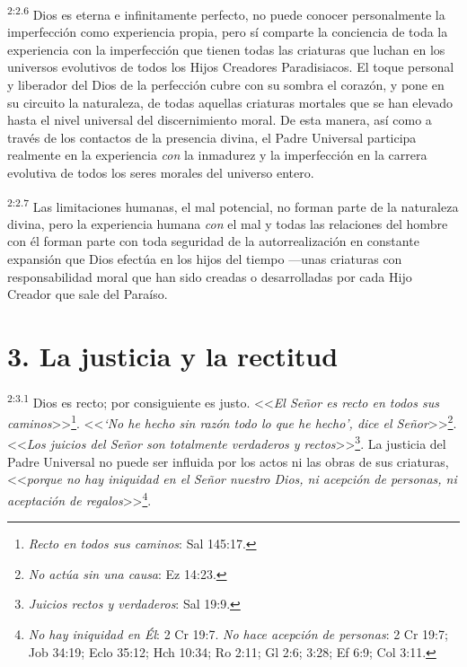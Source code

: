 \par
\textsuperscript{2:2.6} Dios es eterna e infinitamente perfecto, no puede conocer personalmente la imperfección como experiencia propia, pero sí comparte la conciencia de toda la experiencia con la imperfección que tienen todas las criaturas que luchan en los universos evolutivos de todos los Hijos Creadores Paradisiacos. El toque personal y liberador del Dios de la perfección cubre con su sombra el corazón, y pone en su circuito la naturaleza, de todas aquellas criaturas mortales que se han elevado hasta el nivel universal del discernimiento moral. De esta manera, así como a través de los contactos de la presencia divina, el Padre Universal participa realmente en la experiencia \textit{con} la inmadurez y la imperfección en la carrera evolutiva de todos los seres morales del universo entero.

\par
\textsuperscript{2:2.7} Las limitaciones humanas, el mal potencial, no forman parte de la naturaleza divina, pero la experiencia humana \textit{con} el mal y todas las relaciones del hombre con él forman parte con toda seguridad de la autorrealización en constante expansión que Dios efectúa en los hijos del tiempo ---unas criaturas con responsabilidad moral que han sido creadas o desarrolladas por cada Hijo Creador que sale del Paraíso.

\section*{3. La justicia y la rectitud}
\par
\textsuperscript{2:3.1} Dios es recto; por consiguiente es justo. <<\textit{El Señor es recto en todos sus caminos}>>\footnote{\textit{Recto en todos sus caminos}: Sal 145:17.}. <<\textit{`No he hecho sin razón todo lo que he hecho', dice el Señor}>>\footnote{\textit{No actúa sin una causa}: Ez 14:23.}. <<\textit{Los juicios del Señor son totalmente verdaderos y rectos}>>\footnote{\textit{Juicios rectos y verdaderos}: Sal 19:9.}. La justicia del Padre Universal no puede ser influida por los actos ni las obras de sus criaturas, <<\textit{porque no hay iniquidad en el Señor nuestro Dios, ni acepción de personas, ni aceptación de regalos}>>\footnote{\textit{No hay iniquidad en Él}: 2 Cr 19:7. \textit{No hace acepción de personas}: 2 Cr 19:7; Job 34:19; Eclo 35:12; Hch 10:34; Ro 2:11; Gl 2:6; 3:28; Ef 6:9; Col 3:11.}.

